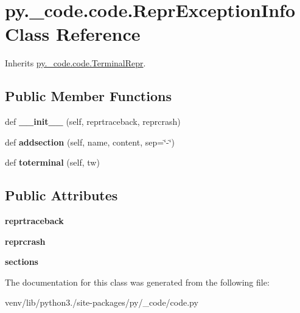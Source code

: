 \hypertarget{classpy_1_1__code_1_1code_1_1_repr_exception_info}{}\section{py.\+\_\+code.\+code.\+Repr\+Exception\+Info Class Reference}
\label{classpy_1_1__code_1_1code_1_1_repr_exception_info}


Inherits \hyperlink{classpy_1_1__code_1_1code_1_1_terminal_repr}{py.\+\_\+code.\+code.\+Terminal\+Repr}.

\subsection*{Public Member Functions}
\begin{DoxyCompactItemize}
\item 
\mbox{\label{classpy_1_1__code_1_1code_1_1_repr_exception_info_a285fde819cbcf2af6ed4e75876ce4bbd}} 
def {\bfseries \+\_\+\+\_\+init\+\_\+\+\_\+} (self, reprtraceback, reprcrash)
\item 
\mbox{\label{classpy_1_1__code_1_1code_1_1_repr_exception_info_a8a1154b7876fd7ba11d8a42c7765c93c}} 
def {\bfseries addsection} (self, name, content, sep=\char`\"{}-\/\char`\"{})
\item 
\mbox{\label{classpy_1_1__code_1_1code_1_1_repr_exception_info_a0cd4c105efca2a049fe41bcc3d857da3}} 
def {\bfseries toterminal} (self, tw)
\end{DoxyCompactItemize}
\subsection*{Public Attributes}
\begin{DoxyCompactItemize}
\item 
\mbox{\label{classpy_1_1__code_1_1code_1_1_repr_exception_info_a4b302a8f8c3fccfb2cc7d314ccc0cda2}} 
{\bfseries reprtraceback}
\item 
\mbox{\label{classpy_1_1__code_1_1code_1_1_repr_exception_info_a81d4e5cd150a199c51e705cd1da93fc5}} 
{\bfseries reprcrash}
\item 
\mbox{\label{classpy_1_1__code_1_1code_1_1_repr_exception_info_a1cf7c10f3fb509d7d20d355bfd599e26}} 
{\bfseries sections}
\end{DoxyCompactItemize}


The documentation for this class was generated from the following file\+:\begin{DoxyCompactItemize}
\item 
venv/lib/python3./site-\/packages/py/\+\_\+code/code.\+py\end{DoxyCompactItemize}
